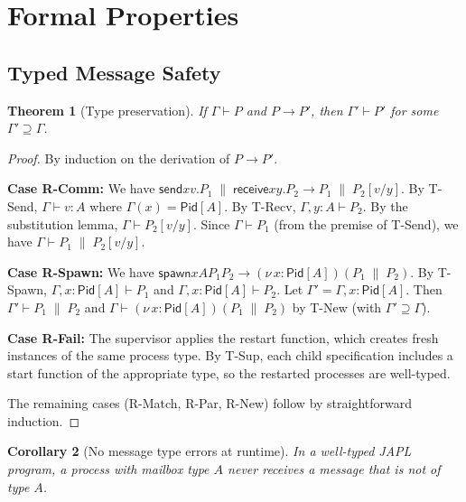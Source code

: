 \documentclass[11pt,a4paper]{article}
\newtheorem{theorem}{Theorem}[section]
\newtheorem{corollary}[theorem]{Corollary}
\newcommand{\ppar}{\;\|\;}
\newcommand{\pnew}[1]{(\nu\, #1)}
\newcommand{\Pid}{\mathsf{Pid}}
\newcommand{\spawn}{\mathsf{spawn}}
\newcommand{\sendf}{\mathsf{send}}
\newcommand{\recvf}{\mathsf{receive}}
\begin{document}
\section{Formal Properties}\label{sec:properties}

\subsection{Typed Message Safety}

\begin{theorem}[Type preservation]\label{thm:preservation}
If $\Gamma \vdash P$ and $P \rightarrow P'$, then $\Gamma' \vdash P'$ for some $\Gamma' \supseteq \Gamma$.
\end{theorem}

\begin{proof}
By induction on the derivation of $P \rightarrow P'$.

\textbf{Case R-Comm:} We have $\sendf{x}{v}.P_1 \ppar \recvf{x}{y}.P_2 \rightarrow P_1 \ppar P_2[v/y]$. By T-Send, $\Gamma \vdash v : A$ where $\Gamma(x) = \Pid[A]$. By T-Recv, $\Gamma, y : A \vdash P_2$. By the substitution lemma, $\Gamma \vdash P_2[v/y]$. Since $\Gamma \vdash P_1$ (from the premise of T-Send), we have $\Gamma \vdash P_1 \ppar P_2[v/y]$.

\textbf{Case R-Spawn:} We have $\spawn{x}{A}{P_1}{P_2} \rightarrow \pnew{x : \Pid[A]}(P_1 \ppar P_2)$. By T-Spawn, $\Gamma, x : \Pid[A] \vdash P_1$ and $\Gamma, x : \Pid[A] \vdash P_2$. Let $\Gamma' = \Gamma, x : \Pid[A]$. Then $\Gamma' \vdash P_1 \ppar P_2$ and $\Gamma \vdash \pnew{x : \Pid[A]}(P_1 \ppar P_2)$ by T-New (with $\Gamma' \supseteq \Gamma$).

\textbf{Case R-Fail:} The supervisor applies the restart function, which creates fresh instances of the same process type. By T-Sup, each child specification includes a start function of the appropriate type, so the restarted processes are well-typed.

The remaining cases (R-Match, R-Par, R-New) follow by straightforward induction.
\end{proof}

\begin{corollary}[No message type errors at runtime]\label{cor:no-msg-errors}
In a well-typed JAPL program, a process with mailbox type $A$ never receives a message that is not of type $A$.
\end{corollary}
\end{document}

